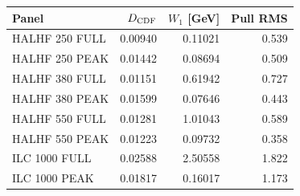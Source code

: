 \begin{tabular}{@{}lrrr@{}}
\toprule
Panel & $D_{\rm CDF}$ & $W_1$ [GeV] & Pull RMS\\
\midrule
HALHF 250 FULL & 0.00940 & 0.11021 & 0.539\\
HALHF 250 PEAK & 0.01442 & 0.08694 & 0.509\\
HALHF 380 FULL & 0.01151 & 0.61942 & 0.727\\
HALHF 380 PEAK & 0.01599 & 0.07646 & 0.443\\
HALHF 550 FULL & 0.01281 & 1.01043 & 0.589\\
HALHF 550 PEAK & 0.01223 & 0.09732 & 0.358\\
ILC 1000 FULL & 0.02588 & 2.50558 & 1.822\\
ILC 1000 PEAK & 0.01817 & 0.16017 & 1.173\\
\bottomrule
\end{tabular}
